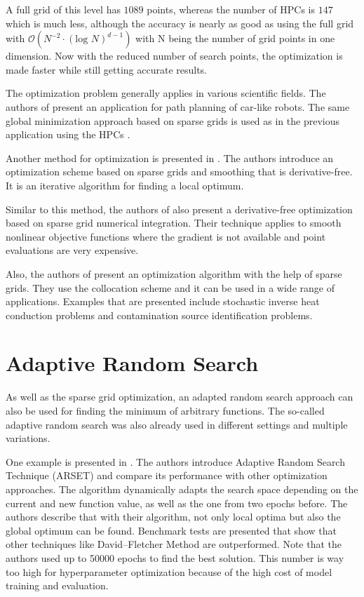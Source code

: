 A full grid of this level has $ 1089 $ points, whereas the number of HPCs is $ 147 $ which is much less, although the accuracy is nearly as good as using the full grid with $ \mathcal{O}\left(N^{-2} \cdot \left(\text{log }N\right)^{d-1}\right) $ with N being the number of grid points in one dimension. Now with the reduced number of search points, the optimization is made faster while still getting accurate results. 
\newline 

The optimization problem generally applies in various scientific fields. The authors of \cite{saska2007path} present an application for path planning of car-like robots. The same global minimization approach based on sparse grids is used as in the previous application using the HPCs \cite{duan2016induction, novak1996global}.
\newline 

Another method for optimization is presented in \cite{hulsmann2013spagrow}. The authors introduce an optimization scheme based on sparse grids and smoothing that is derivative-free. It is an iterative algorithm for finding a local optimum.

Similar to this method, the authors of \cite{chen2013derivative} also present a derivative-free optimization based on sparse grid numerical integration. Their technique applies to smooth nonlinear objective functions where the gradient is not available and point evaluations are very expensive.

Also, the authors of \cite{sankaran2009stochastic} present an optimization algorithm with the help of sparse grids. They use the collocation scheme and it can be used in a wide range of applications. Examples that are presented include stochastic inverse heat conduction problems and contamination source identification problems.

\section{Adaptive Random Search}\label{Adaptive_random_search}

As well as the sparse grid optimization, an adapted random search approach can also be used for finding the minimum of arbitrary functions. The so-called adaptive random search was also already used in different settings and multiple variations. \newline 

One example is presented in \cite{hamzaccebi2006heuristic}. The authors introduce Adaptive Random Search Technique (ARSET) and compare its performance with other optimization approaches. The algorithm dynamically adapts the search space depending on the current and new function value, as well as the one from two epochs before. The authors describe that with their algorithm, not only local optima but also the global optimum can be found. Benchmark tests are presented that show that other techniques like David–Fletcher Method \cite{schilling1999applied} are outperformed. Note that the authors used up to 50000 epochs to find the best solution. This number is way too high for hyperparameter optimization because of the high cost of model training and evaluation. \newline 

